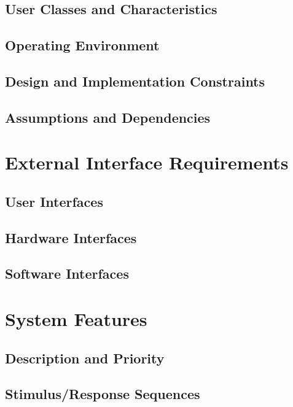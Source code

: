 \documentclass{scrreprt}
\begin{document}
\section{User Classes and Characteristics}

\section{Operating Environment}

\section{Design and Implementation Constraints}

\section{Assumptions and Dependencies}


\chapter{External Interface Requirements}

\section{User Interfaces}

\section{Hardware Interfaces}

\section{Software Interfaces}


\chapter{System Features}

\section{Description and Priority}

\section{Stimulus/Response Sequences}
\end{document}
